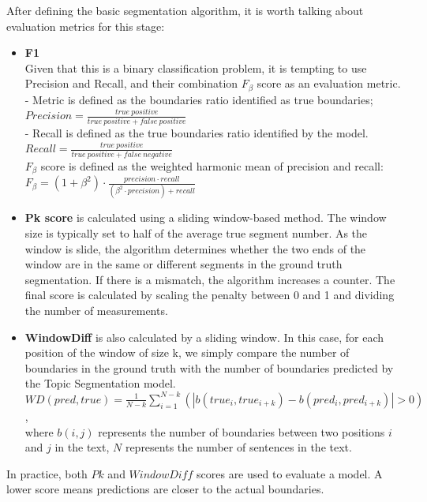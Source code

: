 \documentclass[PMI,VKR]{HSEUniversity}
\begin{document}
After defining the basic segmentation algorithm, it is worth talking about evaluation metrics for this stage:
\begin{itemize}
    \item \textbf{F1}\\
    Given that this is a binary classification problem, it is tempting to use Precision and Recall, and their combination $F_{\beta}$ score as an evaluation metric. \\ 
     - Metric is defined as the boundaries ratio identified as true boundaries; \\
       $Precision = \frac{true \: positive}{true \: positive + false \: positive}$ \\
     - Recall is defined as the true boundaries ratio identified by the model. \\
       $Recall = \frac{true \: positive}{true \: positive + false \: negative}$ \\
    $F_{\beta}$ score is defined as the weighted harmonic mean of precision and recall: \\
    $F_{\beta} = (1 + \beta^{2}) \cdot \frac{precision \cdot recall}{(\beta^{2} \cdot precision) + recall}$
    \item \textbf{Pk score} is calculated using a sliding window-based method. The window size is typically set to half of the average true segment number. As the window is slide, the algorithm determines whether the two ends of the window are in the same or different segments in the ground truth segmentation. If there is a mismatch, the algorithm increases a counter. The final score is calculated by scaling the penalty between 0 and 1 and dividing the number of measurements.
    \item \textbf{WindowDiff} is also calculated by a sliding window. In this case, for each position of the window of size k, we simply compare the number of boundaries in the ground truth with the number of boundaries predicted by the Topic Segmentation model.\\
    $WD(pred, true) = \frac{1}{N - k}\sum_{i = 1}^{N - k}(\left\lvert b (true_{i}, true_{i + k}) - b(pred_{i}, pred_{i + k}) \right\rvert > 0)$, \\ 
    where $b(i, j)$ represents the number of boundaries between two positions $i$ and $j$ in the text, $N$ represents the number of sentences in the text.
\end{itemize} 

In practice, both $Pk$ and $WindowDiff$ scores are used to evaluate a model. 
A lower score means predictions are closer to the actual boundaries.
\end{document}
